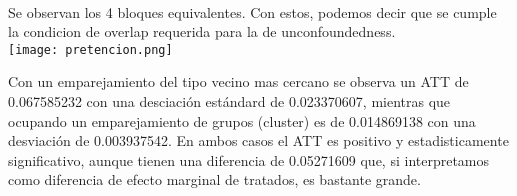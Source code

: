 \documentclass[12pt]{article}
\newenvironment{problem}[2][Problem]{\begin{trivlist}
\item[\hskip \labelsep {\bfseries #1}\hskip \labelsep {\bfseries #2.}]}{\end{trivlist}}
\begin{document}
\begin{problem}{D.2}\\
Se observan los 4 bloques equivalentes. Con estos, podemos decir que se cumple la condicion de overlap requerida para la de unconfoundedness.\\
\centering
\texttt{[image: pretencion.png]}

\end{problem}



\begin{problem}{D.3}
Con un emparejamiento del tipo vecino mas cercano se observa un ATT de 0.067585232 con una desciación estándard de 0.023370607, mientras que ocupando un emparejamiento de grupos (cluster) es de 0.014869138 con una desviación de 0.003937542. En ambos casos el ATT es positivo y estadisticamente significativo, aunque tienen una diferencia de 0.05271609 que, si interpretamos como diferencia de efecto marginal de tratados, es bastante grande.
\end{problem}






























\end{document}
